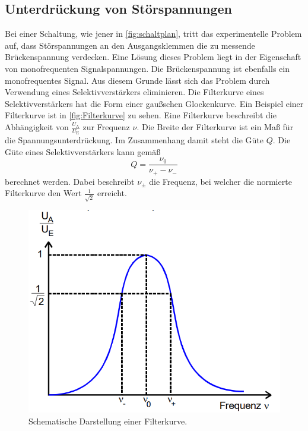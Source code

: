 \subsection{Unterdrückung von Störspannungen}
\label{subsec:unterdrückung}
Bei einer Schaltung, wie jener in \autoref{fig:schaltplan}, tritt das experimentelle Problem auf, dass Störspannungen an den Ausgangsklemmen die zu messende Brückenspannung
verdecken. Eine Lösung dieses Problem liegt in der Eigenschaft von monofrequenten Signalspannungen. Die Brückenspannung ist ebenfalls ein monofrequentes Signal.
Aus diesem Grunde lässt sich das Problem durch Verwendung eines Selektivverstärkers eliminieren.
Die Filterkurve eines Selektivverstärkers hat die Form einer gaußschen Glockenkurve. Ein Beispiel einer Filterkurve ist in \autoref{fig:Filterkurve}
zu sehen. Eine Filterkurve beschreibt die Abhängigkeit von
$\frac{U_{\text{A}}}{U_{\text{E}}}$ zur Frequenz $\nu$. Die Breite der Filterkurve ist ein Maß für die Spannungsunterdrückung. Im Zusammenhang damit steht die Güte $Q$. Die
Güte eines Selektivverstärkers kann gemäß
\begin{equation}
    \label{eqn:Guete}
    Q = \frac{\nu_0}{\nu_+ - \nu_-}
\end{equation}
berechnet werden. Dabei beschreibt $\nu_{\pm}$ die Frequenz, bei welcher die normierte Filterkurve den Wert $\frac{1}{\sqrt{2}}$ erreicht.

\begin{figure}
    \centering
    \includegraphics[width = .5\textwidth]{content/Filterkurve.PNG}
    \caption{Schematische Darstellung einer Filterkurve. \cite{v606}}
    \label{fig:Filterkurve}
\end{figure} 
